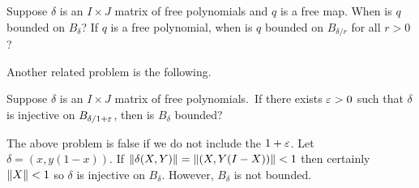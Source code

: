 \documentclass[oneside]{amsbook}
\numberwithin{equation}{section}
\begin{document}
\begin{problem}
	Suppose $\delta$ is an $I\times J$ matrix of free polynomials and $q$ is a free map.
	When is $q$ bounded on $B_\delta$? If $q$ is a free polynomial, when is $q$ bounded on $B_{\delta/r}$ for all $r>0$?
\end{problem}

Another related problem is the following.

\begin{problem}
	Suppose $\delta$ is an $I\times J$ matrix of free polynomials.\
	If there exists $\varepsilon>0$ such that $\delta$ is injective on $B_{\delta/1+\varepsilon}$, then is $B_\delta$ bounded?
\end{problem}

The above problem is false if we do not include the $1+\varepsilon$. Let $\delta = (x, y(1-x))$.
If ${\left\Vert\delta(X,Y)\right\Vert} = {\left\Vert(X,Y(I-X))\right\Vert}<1$ then certainly ${\left\Vert X\right\Vert}<1$ so $\delta$ is injective on $B_\delta$.
However, $B_\delta$ is not bounded.
\end{document}
